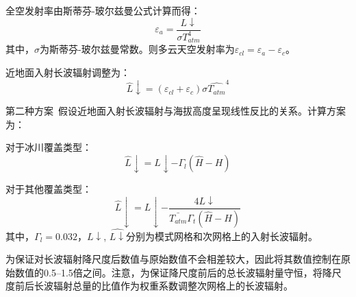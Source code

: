 \begin{enumerate}
全空发射率由斯蒂芬-玻尔兹曼公式计算而得： 
\begin{equation}
\varepsilon_{a}=\frac{L↓}{\sigma T_{atm}^4}
\end{equation}
其中，$\sigma$为斯蒂芬-玻尔兹曼常数。则多云天空发射率为$\varepsilon_{cl}=\varepsilon_{a}-\varepsilon_{c}$。

近地面入射长波辐射调整为：
\begin{equation}
\hat{L}↓=\left(\varepsilon_{cl}+\varepsilon_{c}\right) \sigma \hat{T_{atm}}^4
\end{equation}

第二种方案~\citep{Tricht2016}假设近地面入射长波辐射与海拔高度呈现线性反比的关系。计算方案为：

对于冰川覆盖类型：
\begin{equation}
\hat{L}↓=L↓-\Gamma_{l} \left(\hat{H}-H\right)       
\end{equation}

对于其他覆盖类型：
\begin{equation}
\hat{L}↓=L↓-\frac{4 L↓}{\bar{T_{atm}} \Gamma_{t} \left(\hat{H}-H\right)}      
\end{equation}
其中，$\Gamma_{l}=0.032$，$L↓$, $\hat{L↓}$分别为模式网格和次网格上的入射长波辐射。

为保证对长波辐射降尺度后数值与原始数值不会相差较大，因此将其数值控制在原始数值的0.5--1.5倍之间。注意，为保证降尺度前后的总长波辐射量守恒，将降尺度前后长波辐射总量的比值作为权重系数调整次网格上的长波辐射。

\end{enumerate}